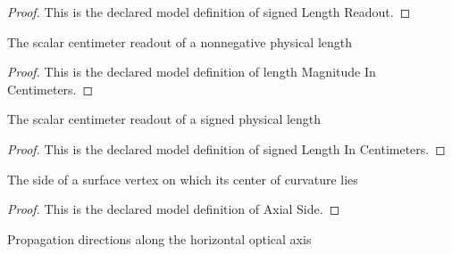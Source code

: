 \begin{proof}
  This is the declared model definition of signed Length Readout.
\end{proof}
\begin{definition}
  \label{def:physics:phyx-mini-0056:phyxminiproblems-problemphyxmini0056-lengthmagnitudeincentimeters}
  The scalar centimeter readout of a nonnegative physical length
\end{definition}
\begin{proof}
  This is the declared model definition of length Magnitude In Centimeters.
\end{proof}
\begin{definition}
  \label{def:physics:phyx-mini-0056:phyxminiproblems-problemphyxmini0056-signedlengthincentimeters}
  The scalar centimeter readout of a signed physical length
\end{definition}
\begin{proof}
  This is the declared model definition of signed Length In Centimeters.
\end{proof}
\begin{definition}
  \label{def:physics:phyx-mini-0056:phyxminiproblems-problemphyxmini0056-axialside}
  The side of a surface vertex on which its center of curvature lies
\end{definition}
\begin{proof}
  This is the declared model definition of Axial Side.
\end{proof}
\begin{definition}
  \label{def:physics:phyx-mini-0056:phyxminiproblems-problemphyxmini0056-propagationdirection}
  Propagation directions along the horizontal optical axis
\end{definition}

